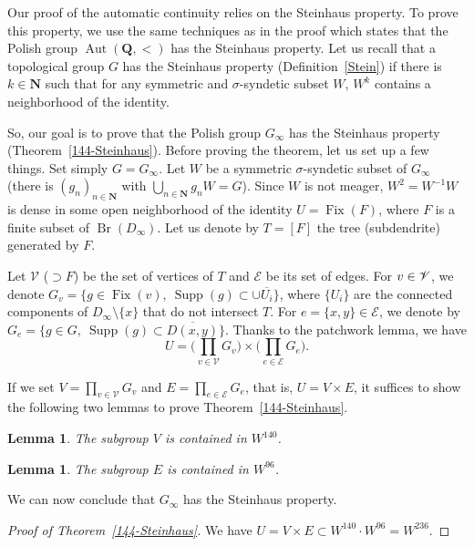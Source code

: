\documentclass[JEP,XML,SOM,Unicode,NoFloatCountersInSection]{cedram}
\let\mathcal\mathscr
\theoremstyle{plain}
\newtheorem{lem}[thm]{Lemma}
\theoremstyle{definition}
\newcommand{\NN}{\mathbf{N}}
\newcommand{\QQ}{\mathbf{Q}}
\newcommand{\cE}{\mathcal{E}}
\newcommand{\cV}{\mathcal{V}}
\DeclareMathOperator{\supp}{Supp}
\DeclareMathOperator{\Aut}{Aut}
\DeclareMathOperator{\Br}{Br}
\DeclareMathOperator{\Fix}{Fix}
\begin{document}
Our proof of the automatic continuity relies on the Steinhaus property. To prove this property, we use the same techniques as in the proof \cite[Th.\,15]{Rosendal-Solecki} which states that the Polish group $\Aut(\QQ,<)$ has the Steinhaus property. Let us recall that a topological group $G$ has the Steinhaus property (Definition~\ref{Stein}) if there is $k\in\NN$ such that for any symmetric and $\sigma$-syndetic subset $W$, $W^k$ contains a neighborhood of the identity.

So, our goal is to prove that the Polish group $G_\infty$ has the Steinhaus property (Theorem~\ref{144-Steinhaus}). Before proving the theorem, let us set up a few things. Set simply $G=G_\infty$. Let $W$ be a symmetric $\sigma$-syndetic subset of $G_\infty$ (\ie there is $(g_n)_{n\in\NN}$ with $\bigcup_{n\in\NN}g_nW=G$). Since $W$ is not meager, $W^2=W^{-1}W$ is dense in some open neighborhood of the identity $U=\Fix(F)$, where $F$ is a finite subset of $\Br(D_\infty)$. Let us denote by $T=[F]$ the tree (\ie subdendrite) generated by $F$.

Let $\cV$ ($\supset F$) be the set of vertices of $T$ and $\cE$ be its set of edges. For $v\in\nobreak\cV$, we denote $G_v=\{g\in \Fix(v),\ \supp(g)\subset\cup \overline{U_i}\}$, where $\{U_i\}$ are the connected components of $D_\infty\setminus\{x\}$ that do not intersect $T$. For $e=\{x,y\}\in\cE$, we denote by \hbox{$G_e=\{g\in G,\ \supp(g)\subset \overline{D(x,y)}\}$}. Thanks to the patchwork lemma, we have
\[
U=\biggl(\prod_{v\in\cV}G_v\biggr)\times\biggl(\prod_{e\in\cE}G_e\biggr).
\]

If we set $V=\prod_{v\in\cV}G_v$ and $E=\prod_{e\in\cE}G_e$, that is, $U=V\times E$, it suffices to show the following two lemmas to prove Theorem~\ref{144-Steinhaus}.

\begin{lem}\label{V}The subgroup $V$ is contained in $W^{140}$.
\end{lem}

\begin{lem}\label{E}The subgroup $E$ is contained in $W^{96}$.
\end{lem}

We can now conclude that $G_\infty$ has the Steinhaus property.
\begin{proof}[Proof of Theorem~\ref{144-Steinhaus}]
We have $U=V\times E\subset W^{140}\cdot W^{96}=W^{236}.$
\end{proof}
\end{document}

